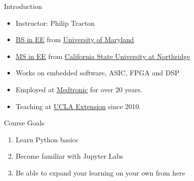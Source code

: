%
%
%
\begin{Slide}{Introduction}
\begin{itemize} 
  \item Instructor: Philip Tracton
  \item \underline{\href{http://www.ece.umd.edu/}{BS in EE}} from \underline{\href{http://www.umd.edu}{University of Maryland}}
  \item \underline{\href{http://www.ecs.csun.edu/ece/index.html}{MS in EE}} from \underline{\href{http://www.csun.edu}{California State University at Northridge}}
  \item Works on embedded software, ASIC, FPGA and DSP
  \item Employed at  \underline{\href{http://www.medtronic.com}{Medtronic}} for over 20 years.
  \item Teaching at \underline{\href{https://www.uclaextension.edu/}{UCLA Extension}} since 2010.
\end{itemize} 
\end{Slide}

%
%
%
\begin{Slide}{Course Goals}
  \begin{enumerate}
  \item Learn Python basics
  \item Become familiar with Jupyter Labs
  \item Be able to expand your learning on your own from here
  \end{enumerate}
\end{Slide} 

